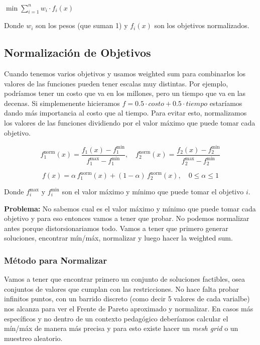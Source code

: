 \documentclass[12pt]{article}
\begin{document}
\begin{center}
$\displaystyle \min \sum_{i=1}^{n} w_i \cdot f_i(x)$
\end{center}

Donde $w_i$ son los pesos (que suman 1) y $f_i(x)$ son los objetivos normalizados.

\subsection{Normalización de Objetivos}

Cuando tenemos varios objetivos y usamos weighted sum para combinarlos los valores de las funciones pueden tener escalas muy distintas. Por ejemplo, podríamos tener un costo que va en los millones, pero un tiempo que va en las decenas. Si simplemenente hicieramos $f = 0.5 \cdot costo + 0.5 \cdot tiempo$ estaríamos dando más importancia al costo que al tiempo. Para evitar esto, normalizamos los valores de las funciones dividiendo por el valor máximo que puede tomar cada objetivo.

\[
f_1^{\text{norm}}(x) = \frac{f_1(x) - f_1^{\min}}{f_1^{\max} - f_1^{\min}}, \quad
f_2^{\text{norm}}(x) = \frac{f_2(x) - f_2^{\min}}{f_2^{\max} - f_2^{\min}}
\]

\[
f(x) = \alpha \, f_1^{\text{norm}}(x) + (1-\alpha) \, f_2^{\text{norm}}(x), \quad 0 \leq \alpha \leq 1
\]

\vspace{0.3em}

Donde $f_{i}^{\max}$ y $f_{i}^{\min}$ son el valor máximo y mínimo que puede tomar el objetivo $i$.

\vspace{1em}

\textbf{Problema:} No sabemos cual es el valor máximo y mínimo que puede tomar cada objetivo y para eso entonces vamos a tener que probar. No podemos normalizar antes porque distorsionariamos todo. Vamos a tener que primero generar soluciones, encontrar mín/máx, normalizar y luego hacer la weighted sum.

\subsubsection{Método para Normalizar}

Vamos a tener que encontrar primero un conjunto de soluciones factibles, osea conjuntos de valores que cumplan con las restricciones. No hace falta probar infinitos puntos, con un barrido discreto (como decir 5 valores de cada varialbe) nos alcanza para ver el Frente de Pareto aproximado y normalizar. En casos más específicos y no dentro de un contexto pedagógico deberíamos calcular el mín/máx de manera más precisa y para esto existe hacer un \textit{mesh grid} o un muestreo aleatorio.
\end{document}
